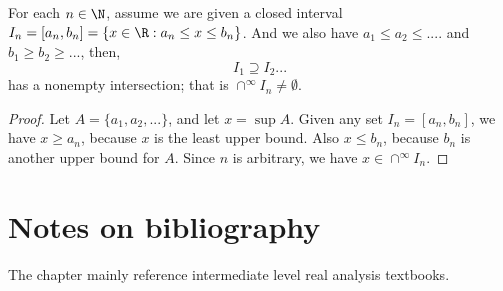 \begin{refsection}
\begin{theorem}
\cite[20]{abbott2001understanding}\label{ch:sets:NestedIntervalProperty}
For each $n\in \N$, assume we are given a closed interval $I_n=[a_n,b_n] = \{x\in \R: a_n \leq x \leq b_n\}$. And we also have $a_1 \leq a_2 \leq ....$ and $b_1 \geq b_2 \geq ...$, then,
$$I_1 \supseteq I_2 ...$$
has a nonempty intersection; that is $\cap^{\infty} I_n \neq \emptyset$.
\end{theorem}
\begin{proof}
 Let $A=\{a_1,a_2,...\}$, and let $x = \sup A$. Given any set $I_n=[a_n,b_n]$, we have $x\geq a_n$, because $x$ is the least upper bound. Also $x\leq b_n$, because $b_n$ is another upper bound for $A$. Since $n$ is arbitrary, we have $x\in \cap^{\infty} I_n$.	
\end{proof}

\section{Notes on bibliography}
The chapter mainly reference intermediate level real analysis textbooks\cite{johnsonbaugh2010foundations}\cite{abbott2001understanding}\cite{thomson2001elementary}.

\printbibliography

\end{refsection}
